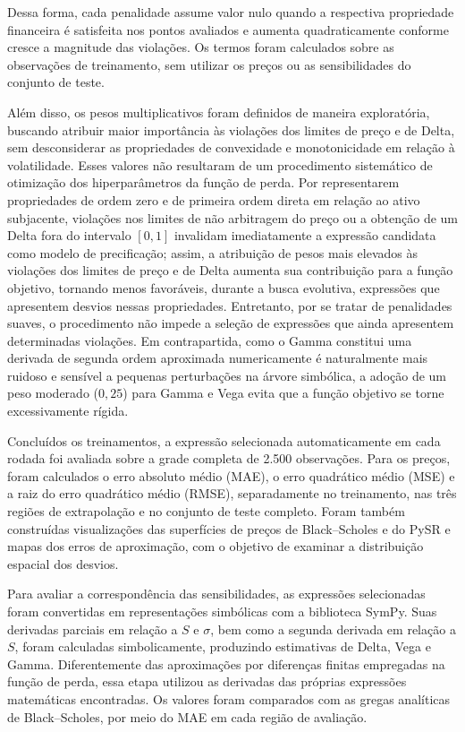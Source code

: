Dessa forma, cada penalidade assume valor nulo quando
a respectiva propriedade financeira é satisfeita
nos pontos avaliados e aumenta quadraticamente
conforme cresce a magnitude das violações.
Os termos foram calculados sobre as observações
de treinamento, sem utilizar os preços ou as
sensibilidades do conjunto de teste.

Além disso, os pesos multiplicativos foram definidos de maneira exploratória, buscando atribuir maior importância às violações dos limites de preço e de Delta, sem desconsiderar as propriedades de convexidade e monotonicidade em relação à volatilidade. Esses valores não resultaram de um procedimento sistemático de otimização dos hiperparâmetros da função de perda. Por representarem propriedades de ordem zero e de primeira ordem direta em relação ao ativo subjacente, violações nos limites de não arbitragem do preço ou a obtenção de um Delta fora do intervalo $[0,1]$ invalidam imediatamente a expressão candidata como modelo de precificação; assim, a atribuição de pesos mais elevados às violações dos limites de preço e de Delta aumenta sua contribuição para a função objetivo, tornando menos favoráveis, durante a busca evolutiva, expressões que apresentem desvios nessas propriedades. Entretanto, por se tratar de penalidades suaves, o procedimento não impede a seleção de expressões que ainda apresentem determinadas violações. Em contrapartida, como o Gamma constitui uma derivada de segunda ordem aproximada numericamente é naturalmente mais ruidoso e sensível a pequenas perturbações na árvore simbólica, a adoção de um peso moderado ($0{,}25$) para Gamma e Vega evita que a função objetivo se torne excessivamente rígida.


Concluídos os treinamentos, a expressão selecionada automaticamente em cada rodada foi avaliada sobre a grade completa de 2.500 observações. Para os preços, foram calculados o erro absoluto médio (MAE), o erro quadrático médio (MSE) e a raiz do erro quadrático médio (RMSE), separadamente no treinamento, nas três regiões de extrapolação e no conjunto de teste completo. Foram também construídas visualizações das superfícies de preços de Black--Scholes e do PySR e mapas dos erros de aproximação, com o objetivo de examinar a distribuição espacial dos desvios.

Para avaliar a correspondência das sensibilidades, as expressões selecionadas foram convertidas em representações simbólicas com a biblioteca SymPy. Suas derivadas parciais em relação a $S$ e $\sigma$, bem como a segunda derivada em relação a $S$, foram calculadas simbolicamente, produzindo estimativas de Delta, Vega e Gamma. Diferentemente das aproximações por diferenças finitas empregadas na função de perda, essa etapa utilizou as derivadas das próprias expressões matemáticas encontradas. Os valores foram comparados com as gregas analíticas de Black--Scholes, por meio do MAE em cada região de avaliação.

